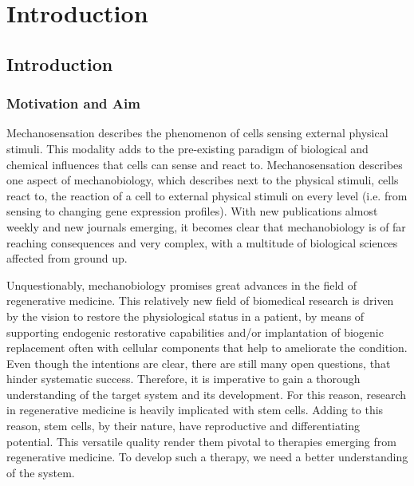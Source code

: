 \newcommand{\package}{\emph}


\chapter{Introduction}

\section{Introduction}
\subsection{Motivation and Aim}
\label{sec:motivation}
Mechanosensation describes the phenomenon of cells sensing external physical stimuli.  This modality adds to the pre-existing paradigm of biological and chemical influences that cells can sense and react to. Mechanosensation describes one aspect of mechanobiology, which describes next to the physical stimuli, cells react to, the reaction of a cell to external physical stimuli on every level (i.e. from sensing to changing gene expression profiles).  With new publications almost weekly and new journals emerging, it becomes clear that mechanobiology is of far reaching consequences and very complex, with a multitude of biological sciences affected from ground up. 
\par 

Unquestionably, mechanobiology promises great advances in the field of regenerative medicine. This relatively new field of biomedical research is driven by the vision to restore the physiological status in a patient, by means of supporting endogenic restorative capabilities and/or implantation of biogenic replacement often with cellular components that help to ameliorate the condition.  Even though the intentions are clear, there are still many open questions, that hinder systematic success. Therefore, it is imperative to gain a thorough understanding of the target system and its development. For this reason, research in regenerative medicine is heavily implicated with stem cells. Adding to this reason, stem cells, by their nature, have reproductive and differentiating potential. This versatile quality render them pivotal to therapies emerging from regenerative medicine. To develop such a therapy, we need a better understanding of the system. \par

